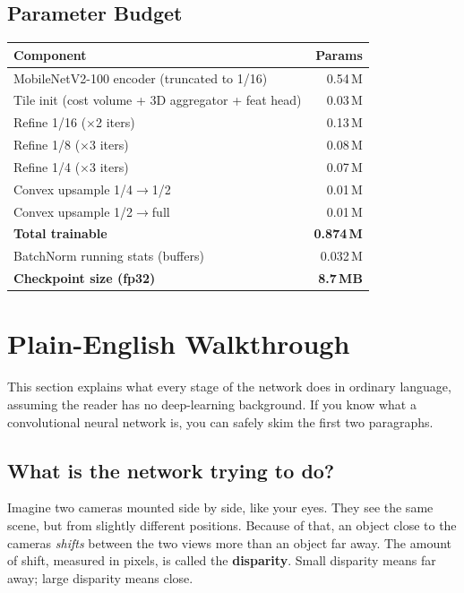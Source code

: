 \documentclass[11pt,a4paper]{article}
\begin{document}
\subsection{Parameter Budget}
\begin{center}
\begin{tabular}{lr}
\toprule
Component & Params \\
\midrule
MobileNetV2-100 encoder (truncated to 1/16) & 0.54\,M \\
Tile init (cost volume + 3D aggregator + feat head) & 0.03\,M \\
Refine 1/16 ($\times$2 iters) & 0.13\,M \\
Refine 1/8  ($\times$3 iters) & 0.08\,M \\
Refine 1/4  ($\times$3 iters) & 0.07\,M \\
Convex upsample 1/4$\rightarrow$1/2 & 0.01\,M \\
Convex upsample 1/2$\rightarrow$full & 0.01\,M \\
\midrule
\textbf{Total trainable} & \textbf{0.874\,M} \\
BatchNorm running stats (buffers) & 0.032\,M \\
\midrule
\textbf{Checkpoint size (fp32)} & \textbf{8.7\,MB} \\
\bottomrule
\end{tabular}
\end{center}

\clearpage
\section{Plain-English Walkthrough}

This section explains what every stage of the network does in ordinary
language, assuming the reader has no deep-learning background. If you
know what a convolutional neural network is, you can safely skim the
first two paragraphs.

\subsection{What is the network trying to do?}

Imagine two cameras mounted side by side, like your eyes. They see the
same scene, but from slightly different positions. Because of that, an
object close to the cameras \textit{shifts} between the two views more
than an object far away. The amount of shift, measured in pixels, is
called the \textbf{disparity}. Small disparity means far away; large
disparity means close.
\end{document}
